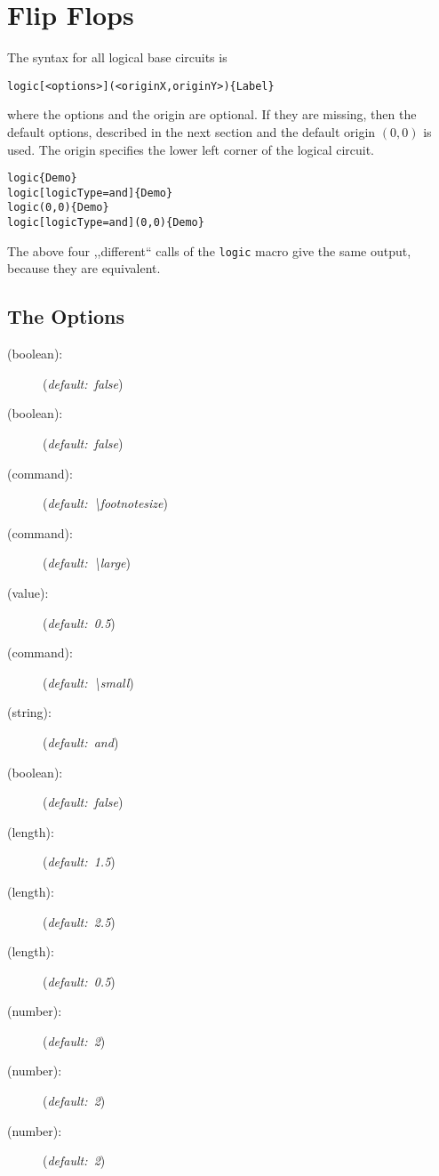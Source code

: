 \section{Flip Flops}

The syntax for all logical base circuits is
\begin{verbatim}
logic[<options>](<originX,originY>){Label}
\end{verbatim}

\noindent where the options and the origin are optional. If they are missing,
then the default options, described in the next section and the default
origin $(0,0)$ is used. The origin specifies the lower left corner
of the logical circuit.

\begin{verbatim}
logic{Demo}
logic[logicType=and]{Demo}
logic(0,0){Demo}
logic[logicType=and](0,0){Demo}
\end{verbatim}

The above four ,,different`` calls of the \verb|logic| macro give the
same output, because they are equivalent. 

\subsection{The Options}

\begin{description}
\item[ (boolean):] (\emph{default:~false})
\item[ (boolean):] (\emph{default:~false})
\item[ (command):] (\emph{default:~\textbackslash footnotesize})
\item[ (command):] (\emph{default:~\textbackslash large})
\item[ (value):] (\emph{default:~0.5})
\item[ (command):] (\emph{default:~\textbackslash small})
\item[ (string):] (\emph{default:~and})
\item[ (boolean):] (\emph{default:~false})
\item[ (length):] (\emph{default:~1.5})
\item[ (length):] (\emph{default:~2.5})
\item[ (length):] (\emph{default:~0.5})
\item[ (number):] (\emph{default:~2})
\item[ (number):] (\emph{default:~2})
\item[ (number):] (\emph{default:~2})
\end{description}

